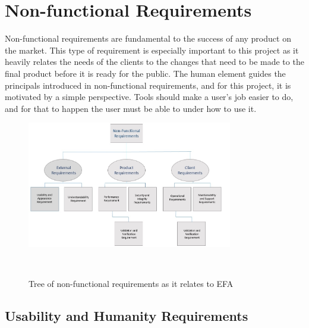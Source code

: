 \documentclass[12pt]{report}
\begin{document}
\chapter{Non-functional Requirements}\label{ch:NonFunc}
Non-functional requirements are fundamental to the success of any product on the market. This type 
of requirement is especially important to this project as it heavily relates the needs of the 
clients to the changes that need to be made to the final product before it is ready for the public. 
The human element guides the principals introduced in non-functional requirements, and for this 
project, it is motivated by a simple perspective. Tools should make a user’s job easier to do, and 
for that to happen the user must be able to under how to use it. 
\begin{figure}[!htb]
	\centering
	\includegraphics[width=0.8\textwidth]{../figures/NONFUNCTIONAL}
	\caption{Tree of non-functional requirements as it relates to EFA}~\label{fig:figure2}
\end{figure}
\section{Usability and Humanity Requirements}\label{sec:Usability}
\end{document}
